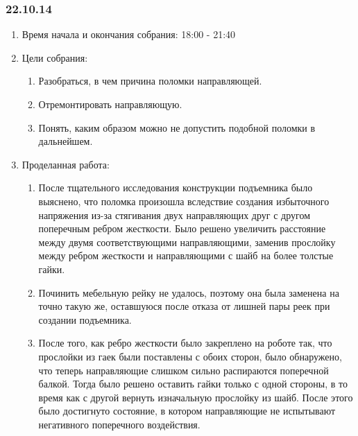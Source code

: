
\subsubsection{22.10.14}

\begin{enumerate}
	\item Время начала и окончания собрания:
	18:00 - 21:40
	\item Цели собрания:
	\begin{enumerate}
	  \item Разобраться, в чем причина поломки направляющей.
	  
	  \item Отремонтировать направляющую.
	  
	  \item Понять, каким образом можно не допустить подобной поломки в дальнейшем.
	  
    \end{enumerate}
    
	\item Проделанная работа:
	\begin{enumerate}
	  \item После тщательного исследования конструкции подъемника было выяснено, что поломка произошла вследствие создания избыточного напряжения из-за стягивания двух направляющих друг с другом поперечным ребром жесткости. Было решено увеличить расстояние между двумя соответствующими направляющими, заменив прослойку между ребром жесткости и направляющими с шайб на более толстые гайки.
      
      \item Починить мебельную рейку не удалось, поэтому она была заменена на точно такую же, оставшуюся после отказа от лишней пары реек при создании подъемника.
      
      \item После того, как ребро жесткости было закреплено на роботе так, что прослойки из гаек были поставлены с обоих сторон, было обнаружено, что теперь направляющие слишком сильно распираются поперечной балкой. Тогда было решено оставить гайки только с одной стороны, в то время как с другой вернуть изначальную прослойку из шайб. После этого было достигнуто состояние, в котором направляющие не испытывают негативного поперечного воздействия.
      

\end{enumerate}
\end{enumerate}

